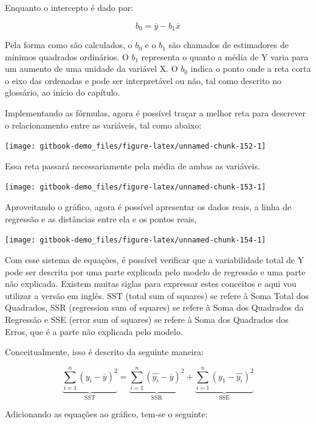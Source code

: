 \documentclass[
]{book}
\begin{document}
Enquanto o intercepto é dado por:

\[b_0 = \overline{y} - b_1 \overline{x}\]

Pela forma como são calculados, o \(b_0\) e o \(b_1\) são chamados de estimadores de mínimos quadrados ordinários. O \(b_1\) representa o quanto a média de Y varia para um aumento de uma unidade da variável X. O \(b_0\) indica o ponto onde a reta corta o eixo das ordenadas e pode ser
interpretável ou não, tal como descrito no glossário, ao início do capítulo.

Implementando as fórmulas, agora é possível traçar a melhor reta para descrever o relacionamento entre as variáveis, tal como abaixo:

\begin{center}\texttt{[image: gitbook-demo\_files/figure-latex/unnamed-chunk-152-1]} \end{center}

Essa reta passará necessariamente pela média de ambas as variáveis.

\begin{center}\texttt{[image: gitbook-demo\_files/figure-latex/unnamed-chunk-153-1]} \end{center}

Aproveitando o gráfico, agora é possível apresentar os dados reais, a linha de regressão e as distâncias entre ela e os pontos reais,

\begin{center}\texttt{[image: gitbook-demo\_files/figure-latex/unnamed-chunk-154-1]} \end{center}

Com esse sistema de equações, é possível verificar que a variabilidade total de Y pode ser descrita por uma parte explicada pelo modelo de regressão e uma parte não explicada. Existem muitas siglas para expressar estes conceitos e aqui vou utilizar a versão em inglês. SST (total sum of squares) se refere à Soma Total dos Quadrados, SSR (regression sum of squares) se refere à Soma dos Quadrados da Regressão e SSE (error sum of squares) se refere à Soma dos Quadrados dos Erros, que é a parte não explicada pelo modelo.

Conceitualmente, isso é descrito da seguinte maneira:

\[\underbrace{\sum\limits_{i=1}^{n} (y_i-\overline{y})^2}_\text{SST} = \underbrace{\sum\limits_{i=1}^{n} (\widehat{y_i}-\overline{y})^2}_\text{SSR} + \underbrace{\sum\limits_{i=1}^{n} (y_1-\widehat{y_i})^2}_\text{SSE}\]

Adicionando as equações ao gráfico, tem-se o seguinte:
\end{document}
